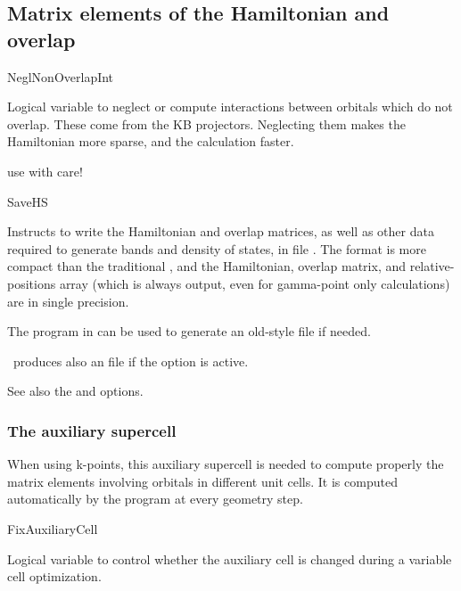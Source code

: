 \subsection{Matrix elements of the Hamiltonian and overlap}


\begin{fdflogicalF}{NeglNonOverlapInt}
  
  Logical variable to neglect or compute interactions between orbitals
  which do not overlap. These come from the KB projectors.  Neglecting
  them makes the Hamiltonian more sparse, and the calculation faster.
  
  \note use with care!

\end{fdflogicalF}

\begin{fdflogicalF}{SaveHS}

  Instructs to write the Hamiltonian and overlap matrices, as well as
  other data required to generate bands and density of states, in file
  . The  format is more compact than the
  traditional , and the Hamiltonian, overlap matrix, and
  relative-positions array (which is always output, even for
  gamma-point only calculations) are in single precision.

  The program  in  can be used to
  generate an old-style  file if needed.

  \siesta\ produces also an  file if the  option
  is active.  


  See also the  and 
  options.

\end{fdflogicalF}



\subsubsection{The auxiliary supercell}

When using k-points, this auxiliary supercell is needed to compute properly
the matrix elements involving orbitals in different unit cells.
It is computed automatically by the program at every geometry step.

\begin{fdflogicalF}{FixAuxiliaryCell}
  
  Logical variable to control whether the auxiliary cell is changed
  during a variable cell optimization.

\end{fdflogicalF}

